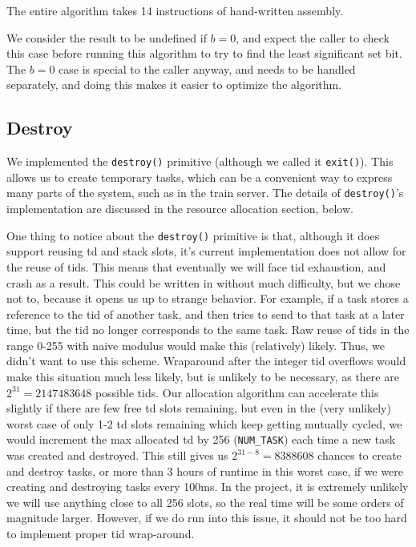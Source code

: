 \documentclass[titlepage]{article}
\begin{document}
The entire algorithm takes 14 instructions of hand-written assembly.

We consider the result to be undefined if $b=0$, and expect the caller to check
this case before running this algorithm to try to find the least significant set bit.
The $b=0$ case is special to the caller anyway, and needs to be handled separately,
and doing this makes it easier to optimize the algorithm.

\subsection{Destroy}
We implemented the \texttt{destroy()} primitive (although we called it
\texttt{exit()}).
This allows us to create temporary tasks, which can be a convenient way to
express many parts of the system, such as in the train server. The details of
\texttt{destroy()}'s implementation are discussed in the resource allocation
section, below.

One thing to notice about the \texttt{destroy()} primitive is that, although
it does support reusing td and stack slots, it's current implementation does
not allow for the reuse of tids. This means that eventually we will face tid
exhaustion, and crash as a result. This could be written in without much
difficulty, but we chose not to, because it opens us up to strange behavior.
For example, if a task stores a reference to the tid of another task, and then
tries to send to that task at a later time, but the tid no longer corresponds
to the same task. Raw reuse of tids in the range 0-255 with naive modulus
would make this (relatively) likely. Thus, we didn't want to use this scheme.
Wraparound after the integer tid overflows would make this situation much less
likely, but is unlikely to be necessary, as there are $2^{31} = 2147483648$
possible tids. Our allocation algorithm can accelerate this slightly if there
are few free td slots remaining, but even in the (very unlikely) worst case of
only 1-2 td slots remaining which keep getting mutually cycled, we would
increment the max allocated td by 256 (\texttt{NUM\_TASK}) each time a new
task was created and destroyed. This still gives us $2^{31 - 8} = 8388608$
chances to create and destroy tasks, or more than 3 hours of runtime in this
worst case, if we were creating and destroying tasks every 100ms. In the
project, it is extremely unlikely we will use anything close to all 256 slots,
so the real time will be some orders of magnitude larger. However, if we do
run into this issue, it should not be too hard to implement proper tid
wrap-around.
\end{document}
